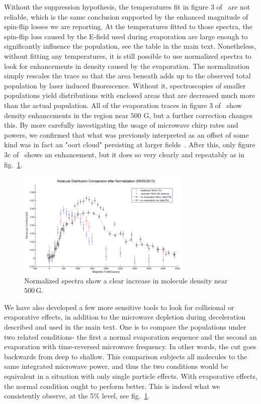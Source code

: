 \documentclass[%
 reprint,
 amsmath,amssymb,
 aps,
prl,
]{revtex4-1}
\begin{document}
Without the suppression hypothesis, the temperatures fit in figure 3 of~\cite{Stuhl2012evap} are not reliable, which is the same conclusion supported by the enhanced magnitude of spin-flip losses we are reporting.
At the temperatures fitted to those spectra, the spin-flip loss caused by the E-field used during evaporation are large enough to significantly influence the population, see the table in the main text.
Nonetheless, without fitting any temperatures, it is still possible to use normalized spectra to look for enhancements in density caused by the evaporation.
The normalization simply rescales the trace so that the area beneath adds up to the observed total population by laser induced fluorescence. 
Without it, spectroscopies of smaller populations yield distributions with enclosed areas that are decreased much more than the actual population.
All of the evaporation traces in figure 3 of~\cite{Stuhl2012evap} show density enhancements in the region near $500\text{ G}$, but a further correction changes this.
By more carefully investigating the usage of microwave chirp rates and powers, we confirmed that what was previously interpreted as an offset of some kind was in fact an "oort cloud" persisting at larger fields~\cite{eric's book}.
After this, only figure 3c of~\cite{Sthul2012evap} shows an enhancement, but it does so very clearly and repeatably as in fig.~\ref{fig:normenhance}.

\begin{figure}[tb]
\includegraphics[width=\linewidth]{SuppFigs/NormEnhance.png}%
\caption{
Normalized spectra show a clear increase in molecule density near $500\,\text{G}$.
}
\label{fig:normenhance}
\end{figure}

We have also developed a few more sensitive tools to look for collisional or evaporative effects, in addition to the microwave depletion during deceleration described and used in the main text.
One is to compare the populations under two related conditions- the first a normal evaporation sequence and the second an evaporation with time-reversed microwave frequency. 
In other words, the cut goes backwards from deep to shallow. 
This comparison subjects all molecules to the same integrated microwave power, and thus the two conditions would be equivalent in a situation with only single particle effects. 
With evaporative effects, the normal condition ought to perform better. 
This is indeed what we consistently observe, at the 5\% level, see fig.~\ref{fig:normenhance}.
\end{document}
